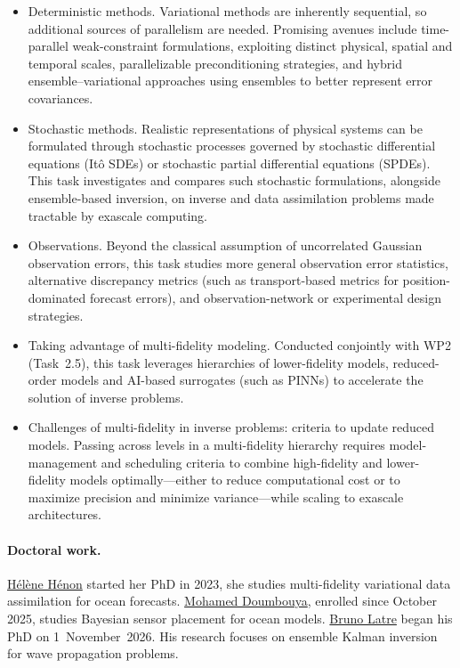 \begin{itemize}
\item[T4.1] Deterministic methods. Variational methods are inherently
  sequential, so additional sources of parallelism are needed. Promising
  avenues include time-parallel weak-constraint formulations, exploiting
  distinct physical, spatial and temporal scales, parallelizable
  preconditioning strategies, and hybrid ensemble--variational approaches
  using ensembles to better represent error covariances.
\item[T4.2] Stochastic methods. Realistic representations of physical
  systems can be formulated through stochastic processes governed by
  stochastic differential equations (Itô SDEs) or stochastic partial
  differential equations (SPDEs). This task investigates and compares
  such stochastic formulations, alongside ensemble-based inversion, on
  inverse and data assimilation problems made tractable by exascale
  computing.
\item[T4.3] Observations. Beyond the classical assumption of uncorrelated
  Gaussian observation errors, this task studies more general observation
  error statistics, alternative discrepancy metrics (such as transport-based
  metrics for position-dominated forecast errors), and observation-network
  or experimental design strategies.
\item[T4.4] Taking advantage of multi-fidelity modeling. Conducted
  conjointly with WP2 (Task~2.5), this task leverages hierarchies of
  lower-fidelity models, reduced-order models and AI-based surrogates
  (such as PINNs) to accelerate the solution of inverse problems.
\item[T4.5] Challenges of multi-fidelity in inverse problems: criteria to
  update reduced models. Passing across levels in a multi-fidelity
  hierarchy requires model-management and scheduling criteria to combine
  high-fidelity and lower-fidelity models optimally---either to reduce
  computational cost or to maximize precision and minimize variance---while
  scaling to exascale architectures.
\end{itemize}

\paragraph{Doctoral work.} %
\href{https://theses.fr/s371978}{Hélène Hénon} started her PhD in 2023, she studies multi-fidelity
variational data assimilation for ocean forecasts.
\href{https://theses.fr/s420025}{Mohamed Doumbouya}, enrolled since
October 2025, studies Bayesian sensor placement for ocean models.
\href{https://theses.fr/s446600}{Bruno Latre} began his PhD on
\mbox{1 November 2026}. His research focuses on ensemble Kalman inversion for
wave propagation problems.


